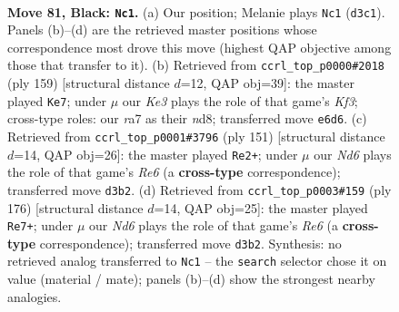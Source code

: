 \documentclass[11pt]{article}
\begin{document}
\clearpage

\begin{figure}[p]\centering
\begin{subfigure}{0.46\textwidth}\centering
\resizebox{\linewidth}{!}{%
\newchessgame
\chessboard[
  setfen={8/R7/4k1pP/5p2/5P2/3n1K2/p7/8 b - - 5 81},
  showmover=false,
  pgfstyle=straightmove, color=movearrow, markmove={d3-c1}
]}
\caption{}
\end{subfigure}\hfill
\begin{subfigure}{0.46\textwidth}\centering
\resizebox{\linewidth}{!}{%
\newchessgame
\chessboard[
  setfen={3N4/8/5k2/p1n1p3/P1P1P3/4K3/8/8 b - - 4 80},
  showmover=false,
  pgfstyle=straightmove, color=movearrow, markmove={f6-e7}
]}
\caption{}
\end{subfigure}
\\[4pt]
\begin{subfigure}{0.46\textwidth}\centering
\resizebox{\linewidth}{!}{%
\newchessgame
\chessboard[
  setfen={8/8/R7/5p1k/6p1/4r1P1/6K1/8 b - - 3 76},
  showmover=false,
  pgfstyle=straightmove, color=movearrow, markmove={e3-e2}
]}
\caption{}
\end{subfigure}\hfill
\begin{subfigure}{0.46\textwidth}\centering
\resizebox{\linewidth}{!}{%
\newchessgame
\chessboard[
  setfen={8/7k/4R1p1/6P1/5K1P/8/8/r7 w - - 67 89},
  showmover=false,
  pgfstyle=straightmove, color=movearrow, markmove={e6-e7}
]}
\caption{}
\end{subfigure}
\caption{\textbf{Move 81, Black: \texttt{Nc1}.} (a) Our position; Melanie plays \texttt{Nc1} (\texttt{d3c1}). Panels (b)--(d) are the retrieved master positions whose correspondence most drove this move (highest QAP objective among those that transfer to it). (b) Retrieved from \texttt{ccrl\_top\_p0000\#2018} (ply 159) [structural distance $d$=12, QAP obj=39]: the master played \texttt{Ke7}; under $\mu$ our \emph{Ke3} plays the role of that game's \emph{Kf3}; cross-type roles: our \emph{r}a7 as their \emph{n}d8; transferred move \texttt{e6d6}. (c) Retrieved from \texttt{ccrl\_top\_p0001\#3796} (ply 151) [structural distance $d$=14, QAP obj=26]: the master played \texttt{Re2+}; under $\mu$ our \emph{Nd6} plays the role of that game's \emph{Re6} (a \textbf{cross-type} correspondence); transferred move \texttt{d3b2}. (d) Retrieved from \texttt{ccrl\_top\_p0003\#159} (ply 176) [structural distance $d$=14, QAP obj=25]: the master played \texttt{Re7+}; under $\mu$ our \emph{Nd6} plays the role of that game's \emph{Re6} (a \textbf{cross-type} correspondence); transferred move \texttt{d3b2}. Synthesis: no retrieved analog transferred to \texttt{Nc1} -- the \texttt{search} selector chose it on value (material / mate); panels (b)--(d) show the strongest nearby analogies.}
\label{fig:thought-m161}
\end{figure}
\end{document}
